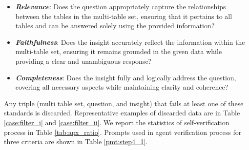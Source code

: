 \begin{itemize}[leftmargin=*,topsep=4pt,itemsep=4pt,parsep=0pt]
    \item \textbf{\textit{Relevance}}: Does the question appropriately capture the relationships between the tables in the multi-table set, ensuring that it pertains to all tables and can be answered solely using the provided information?
    
    \item \textbf{\textit{Faithfulness}}: Does the insight accurately reflect the information within the multi-table set, ensuring it remains grounded in the given data while providing a clear and unambiguous response?
    
    \item \textbf{\textit{Completeness}}: Does the insight fully and logically address the question, covering all necessary aspects while maintaining clarity and coherence?
\end{itemize}

Any triple (multi table set, question, and insight) that fails at least one of these standards is discarded.
Representative examples of discarded data are in Table \ref{case:filter_i} and \ref{case:filter_ii}.
We report the statistics of self-verification process in Table \ref{tab:apx_ratio}.
Prompts used in agent verification process for three criteria are shown in Table \ref{pmt:step4_1}.



